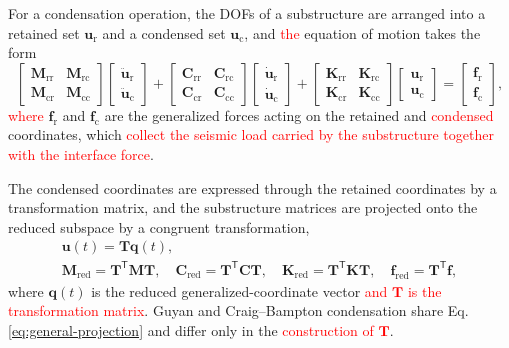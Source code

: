 \documentclass[11pt,a4paper]{article}
\numberwithin{equation}{section}
\newcommand{\rev}[1]{\textcolor{red}{#1}}
\begin{document}
For a condensation operation, the DOFs of a substructure are arranged into a retained set \(\bm{u}_{\mathrm{r}}\) and a condensed set \(\bm{u}_{\mathrm{c}}\), and \rev{the} equation of motion takes the form
\begin{equation}
	\begin{bmatrix}
		\mathbf{M}_{\mathrm{rr}} & \mathbf{M}_{\mathrm{rc}}\\
		\mathbf{M}_{\mathrm{cr}} & \mathbf{M}_{\mathrm{cc}}
	\end{bmatrix}
	\begin{bmatrix}
		\ddot{\bm{u}}_{\mathrm{r}}\\
		\ddot{\bm{u}}_{\mathrm{c}}
	\end{bmatrix}
	+
	\begin{bmatrix}
		\mathbf{C}_{\mathrm{rr}} & \mathbf{C}_{\mathrm{rc}}\\
		\mathbf{C}_{\mathrm{cr}} & \mathbf{C}_{\mathrm{cc}}
	\end{bmatrix}
	\begin{bmatrix}
		\dot{\bm{u}}_{\mathrm{r}}\\
		\dot{\bm{u}}_{\mathrm{c}}
	\end{bmatrix}
	+
	\begin{bmatrix}
		\mathbf{K}_{\mathrm{rr}} & \mathbf{K}_{\mathrm{rc}}\\
		\mathbf{K}_{\mathrm{cr}} & \mathbf{K}_{\mathrm{cc}}
	\end{bmatrix}
	\begin{bmatrix}
		\bm{u}_{\mathrm{r}}\\
		\bm{u}_{\mathrm{c}}
	\end{bmatrix}
	=
	\begin{bmatrix}
		\bm{f}_{\mathrm{r}}\\
		\bm{f}_{\mathrm{c}}
	\end{bmatrix},
	\label{eq:partitioned-local-eom}
\end{equation}
\rev{where} \(\bm{f}_{\mathrm{r}}\) and \(\bm{f}_{\mathrm{c}}\) are the generalized forces acting on the retained and \rev{condensed} coordinates, which \rev{collect the seismic load carried by the substructure together with the interface force}.

The condensed coordinates are expressed through the retained coordinates by a transformation matrix, and the substructure matrices are projected onto the reduced subspace by a congruent transformation,
\begin{equation}
	\begin{gathered}
		\bm{u}(t)=\mathbf{T}\bm{q}(t),\\
		\mathbf{M}_{\mathrm{red}}=\mathbf{T}^{\mathsf{T}}\mathbf{M}\mathbf{T},\quad
		\mathbf{C}_{\mathrm{red}}=\mathbf{T}^{\mathsf{T}}\mathbf{C}\mathbf{T},\quad
		\mathbf{K}_{\mathrm{red}}=\mathbf{T}^{\mathsf{T}}\mathbf{K}\mathbf{T},\quad
		\bm{f}_{\mathrm{red}}=\mathbf{T}^{\mathsf{T}}\bm{f},
	\end{gathered}
	\label{eq:general-projection}
\end{equation}
where \(\bm{q}(t)\) is the reduced generalized-coordinate vector \rev{and \(\mathbf{T}\) is the transformation matrix}. Guyan and Craig--Bampton condensation share Eq. \eqref{eq:general-projection} and differ only in the \rev{construction of \(\mathbf{T}\)}.
\end{document}
